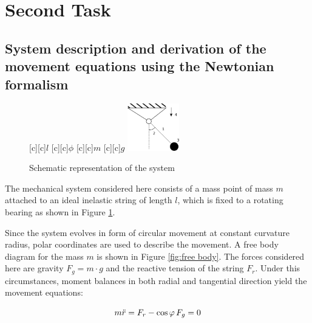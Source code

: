 \documentclass[12pt,bibstyle=none,pagenumberinfooter]{ifmdocument}
\begin{document}
\section{Second Task}

\subsection{System description and derivation of the movement equations using the Newtonian formalism}
\label{sec: NewtonianDerivation}


\begin{figure}[h]
  \begin{center}
    {
        \psfragscanon
      [c][c]{$l$}
      [c][c]{$\phi$}
      [c][c]{$m$}
      [c][c]{$g$}
      \includegraphics[width=0.2\textwidth]{Figures/Zeichnung-1.eps}}
  \end{center}
  \caption{Schematic representation of the system}
  \label{fig:skizze}
\end{figure}


%    



The mechanical system considered here consists of a mass point of mass $m$ attached to an ideal inelastic string of length $l$, which is fixed to a rotating bearing as shown in Figure \ref{fig:skizze}.


Since the system evolves in form of circular movement at constant curvature radius, polar coordinates are used to describe the movement. A free body diagram for the mass $m$ is shown in Figure \ref{fig:free body}. The forces considered here are gravity $F_g = m\cdot g$ and the reactive tension of the string $F_r$. Under this circumstances, moment balances in both radial and tangential direction yield the movement equations:

\begin{equation}
\label{eq: radialbalance}
    m \Ddot{r} = F_r - \cos{\phi}\,F_g = 0
\end{equation}
\end{document}
